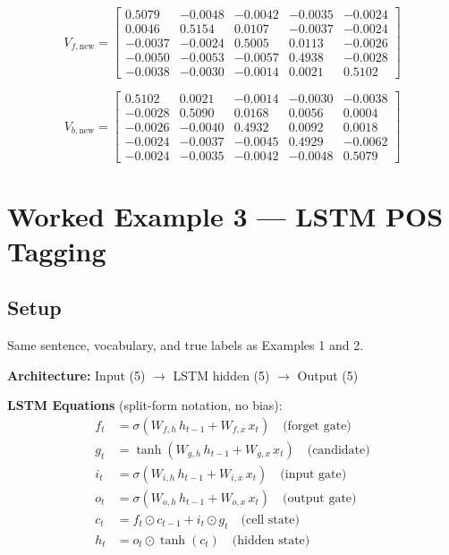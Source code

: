 \begin{equation}
    V_{f,\text{new}} = \begin{bmatrix}
     0.5079 & -0.0048 & -0.0042 & -0.0035 & -0.0024 \\
     0.0046 &  0.5154 &  0.0107 & -0.0037 & -0.0024 \\
    -0.0037 & -0.0024 &  0.5005 &  0.0113 & -0.0026 \\
    -0.0050 & -0.0053 & -0.0057 &  0.4938 & -0.0028 \\
    -0.0038 & -0.0030 & -0.0014 &  0.0021 &  0.5102
    \end{bmatrix}
\end{equation}

\begin{equation}
    V_{b,\text{new}} = \begin{bmatrix}
     0.5102 &  0.0021 & -0.0014 & -0.0030 & -0.0038 \\
    -0.0028 &  0.5090 &  0.0168 &  0.0056 &  0.0004 \\
    -0.0026 & -0.0040 &  0.4932 &  0.0092 &  0.0018 \\
    -0.0024 & -0.0037 & -0.0045 &  0.4929 & -0.0062 \\
    -0.0024 & -0.0035 & -0.0042 & -0.0048 &  0.5079
    \end{bmatrix}
\end{equation}

\section{Worked Example 3 --- LSTM POS Tagging}

\subsection{Setup}

Same sentence, vocabulary, and true labels as Examples 1 and 2.

\textbf{Architecture:} Input (5) $\to$ LSTM hidden (5) $\to$ Output (5)

\textbf{LSTM Equations} (split-form notation, no bias):
\begin{align}
    f_t &= \sigma(W_{f,h}\, h_{t-1} + W_{f,x}\, x_t) \quad \text{(forget gate)} \\
    g_t &= \tanh(W_{g,h}\, h_{t-1} + W_{g,x}\, x_t) \quad \text{(candidate)} \\
    i_t &= \sigma(W_{i,h}\, h_{t-1} + W_{i,x}\, x_t) \quad \text{(input gate)} \\
    o_t &= \sigma(W_{o,h}\, h_{t-1} + W_{o,x}\, x_t) \quad \text{(output gate)} \\
    c_t &= f_t \odot c_{t-1} + i_t \odot g_t \quad \text{(cell state)} \\
    h_t &= o_t \odot \tanh(c_t) \quad \text{(hidden state)}
\end{align}

